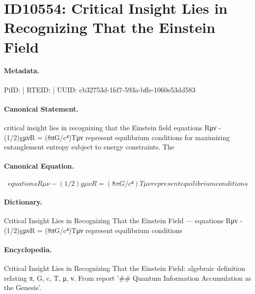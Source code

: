 \section*{ID10554: Critical Insight Lies in Recognizing That the Einstein Field}
\paragraph{Metadata.}
PiID:  | RTEID:  | UUID: cb32753d-1fd7-593a-bffe-1060e53dd583

\paragraph{Canonical Statement.}
critical insight lies in recognizing that the Einstein field equations Rμν - (1/2)gμνR = (8πG/c⁴)Tμν represent equilibrium conditions for maximizing entanglement entropy subject to energy constraints. The

\paragraph{Canonical Equation.}
\[
equations Rμν - (1/2)gμνR = (8πG/c⁴)Tμν represent equilibrium conditions
\]

\paragraph{Dictionary.}
Critical Insight Lies in Recognizing That the Einstein Field — equations Rμν - (1/2)gμνR = (8πG/c⁴)Tμν represent equilibrium conditions

\paragraph{Encyclopedia.}
Critical Insight Lies in Recognizing That the Einstein Field: algebraic definition relating π, G, c, T, μ, ν. From report '\#\# Quantum Information Accumulation as the Genesis'.

